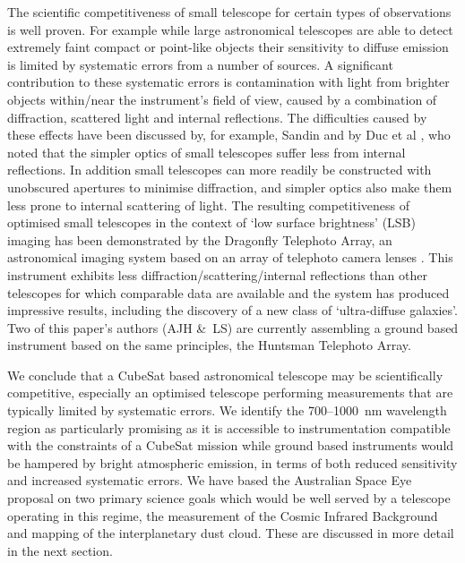 \documentclass[]{iac}
\begin{document}
The scientific competitiveness of small telescope for certain types of observations is well proven. For example while
large astronomical telescopes are able to detect extremely faint compact or point-like objects their sensitivity to
diffuse emission is limited by systematic errors from a number of sources.  A significant contribution to these
systematic errors is contamination with light from brighter objects within/near the instrument's field of view, caused
by a combination of diffraction, scattered light and internal reflections. The difficulties caused by these effects have
been discussed by, for example, Sandin \cite{Sandin2014,Sandin2015} and by Duc et al \cite{Duc2014}, who noted that the
simpler optics of small telescopes suffer less from internal reflections. In addition small telescopes can more readily
be constructed with unobscured apertures to minimise diffraction, and simpler optics also make them less prone to
internal scattering of light. The resulting competitiveness of optimised small telescopes in the context of `low surface
brightness' (LSB) imaging has been demonstrated by the Dragonfly Telephoto Array, an astronomical imaging system based
on an array of telephoto camera lenses \cite{Abraham2014}.  This instrument exhibits less
diffraction/scattering/internal reflections than other telescopes for which comparable data are available
\cite{Abraham2014,Sandin2014} and the system has produced impressive results, including the discovery of a new class of
`ultra-diffuse galaxies'\cite{VanDokkum2015}.  Two of this paper's authors (AJH \&\ LS) are currently assembling a
ground based instrument based on the same principles, the Huntsman Telephoto Array.

We conclude that a CubeSat based astronomical telescope may be scientifically competitive, especially an optimised
telescope performing measurements that are typically limited by systematic errors. We identify the
700--\SI{1000}{\nano\metre} wavelength region as particularly promising as it is accessible to instrumentation
compatible with the constraints of a CubeSat mission while ground based instruments would be hampered by bright
atmospheric emission, in terms of both reduced sensitivity and increased systematic errors. We have based the
Australian Space Eye proposal on two primary science goals which would be well served by a telescope operating in this
regime, the measurement of the Cosmic Infrared Background and mapping of the interplanetary dust cloud. These are
discussed in more detail in the next section.
\end{document}
